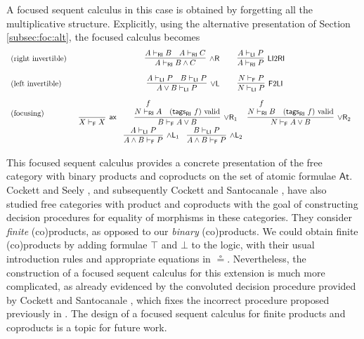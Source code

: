 \documentclass[submission,copyright,creativecommons]{eptcs}
\theoremstyle{definition}
\newcommand{\andlone}{\land \mathsf{L}_{1}}
\newcommand{\andltwo}{\land \mathsf{L}_{2}}
\newcommand{\andr}{\land \mathsf{R}}
\newcommand{\orl}{\lor \mathsf{L}}
\newcommand{\orrone}{\lor \mathsf{R}_{1}}
\newcommand{\orrtwo}{\lor \mathsf{R}_{2}}
\newcommand{\ax}{\mathsf{ax}}
\newcommand{\RI}{\mathsf{RI}}
\newcommand{\LI}{\mathsf{LI}}
\newcommand{\F}{\mathsf{F}}
\newcommand{\proofbox}[1]{\begin{tabular}{l} #1 \end{tabular}}
\begin{document}
A focused sequent calculus in this case is obtained by forgetting all the multiplicative structure. Explicitly, using the alternative presentation of Section \ref{subsec:foc:alt}, the focused calculus becomes
\begin{equation*}\label{eq:focus:byprod}
  \begin{array}{lc}
    \text{(right invertible)} &
    \proofbox{
      \infer[\andr]{A \vdash_{\RI} B \land C}{
        A \vdash_{\RI} B
        &
        A \vdash_{\RI} C
      }
    \qquad
    \infer[\LI 2 \RI]{A \vdash_{\RI} P}{A \vdash_{\LI} P}
    }
    \\[15pt]
    \text{(left invertible)} &
    \proofbox{
    \infer[\orl]{A \lor B \vdash_\LI P}{
      A \vdash_\LI P
      &
      B \vdash_\LI P
    }
    \qquad
    \infer[\F 2 \LI]{N \vdash_{\LI} P}{N \vdash_{\F} P}
    }
    \\[15pt]
    \text{(focusing)} &
    \proofbox{
    \infer[\ax]{X \vdash_{\F} X}{}
    \qquad
    \infer[\orrone]{B \vdash_{\F} A \lor B}{
      \deduce{N \vdash_{\RI} A}{f}
      &
      (\mathsf{tags}_{\RI} \ f) \ \text{valid}
    }
    \quad
    \infer[\orrtwo]{N \vdash_{\F} A \lor B}{
      \deduce{N \vdash_{\RI} B}{f}
      &
      (\mathsf{tags}_{\RI} \ f) \ \text{valid}
    }
    }
    \\[6pt]
    \multicolumn{2}{c}{
    \infer[\andlone]{A \land B \vdash_{\F} P}{A \vdash_{\LI} P}
    \quad
    \infer[\andltwo]{A \land B \vdash_{\F} P}{B \vdash_{\LI} P}
    }
  \end{array}%
\end{equation*}

This focused sequent calculus provides a concrete presentation of the free category with binary products and coproducts on the set of atomic formulae $\mathsf{At}$. Cockett and Seely \cite{CS01}, and subsequently Cockett and Santocanale \cite{CS09}, have also studied free categories with product and coproducts with the goal of constructing decision procedures for equality of morphisms in these categories. They consider \emph{finite} (co)products, as opposed to our \emph{binary} (co)products. We could obtain finite (co)products by adding formulae $\top$ and $\bot$ to the logic, with their usual introduction rules and appropriate equations in $\circeq$. Nevertheless, the construction of a focused sequent calculus for this extension is much more complicated, as already evidenced by the convoluted decision procedure provided by Cockett and Santocanale \cite{CS09}, which fixes the incorrect procedure proposed previously in \cite{CS01}. The design of a focused sequent calculus for finite products and coproducts is a topic for future work.
\end{document}
